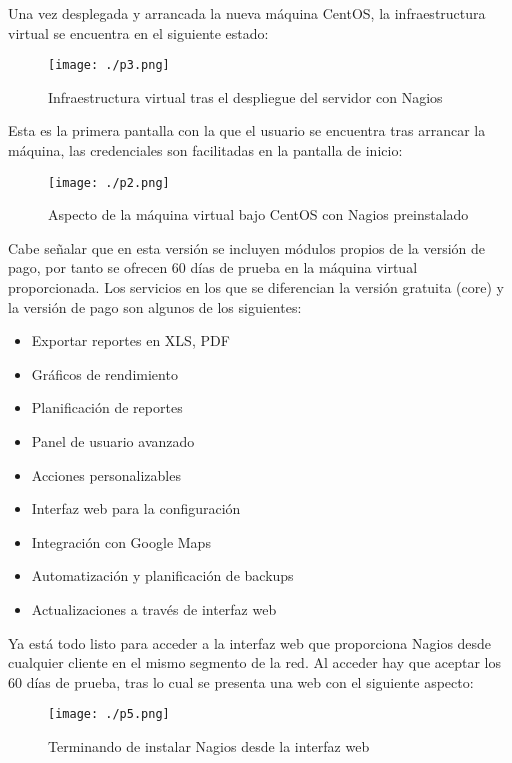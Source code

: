 \documentclass[paper=a4, fontsize=12pt]{scrartcl} %
\begin{document}
Una vez desplegada y arrancada la nueva máquina CentOS, la infraestructura virtual se encuentra en el siguiente estado:

\begin{figure}[H] %
	\centering
	\label{lsblk}
	\texttt{[image: ./p3.png]}
	\caption{Infraestructura virtual tras el despliegue del servidor con Nagios} 
\end{figure}

Esta es la primera pantalla con la que el usuario se encuentra tras arrancar la máquina, las credenciales son facilitadas en la pantalla de inicio:

\begin{figure}[H] %
	\centering
	\label{lsblk}
	\texttt{[image: ./p2.png]}
	\caption{Aspecto de la máquina virtual bajo CentOS con Nagios preinstalado} 
\end{figure}

Cabe señalar que en esta versión se incluyen módulos propios de la versión de pago, por tanto se ofrecen 60 días de prueba en la máquina virtual proporcionada. Los servicios en los que se diferencian la versión gratuita (core) y la versión de pago son algunos de los siguientes: \cite{p6}

\begin{itemize}
	\item Exportar reportes en XLS, PDF
	\item Gráficos de rendimiento
	\item Planificación de reportes
	\item Panel de usuario avanzado
	\item Acciones personalizables
	\item Interfaz web para la configuración
	\item Integración con Google Maps
	\item Automatización y planificación de backups
	\item Actualizaciones a través de interfaz web
\end{itemize}

Ya está todo listo para acceder a la interfaz web que proporciona Nagios desde cualquier cliente en el mismo segmento de la red. Al acceder hay que aceptar los 60 días de prueba, tras lo cual se presenta una web con el siguiente aspecto:

\begin{figure}[H] %
	\centering
	\label{lsblk}
	\texttt{[image: ./p5.png]}
	\caption{Terminando de instalar Nagios desde la interfaz web} 
\end{figure}
\end{document}
